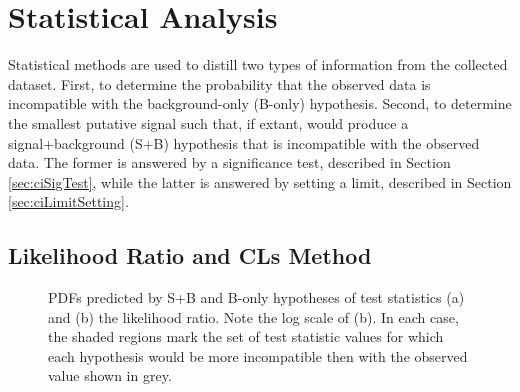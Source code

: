 \section{Statistical Analysis}\label{sec:ciStat}

Statistical methods are used to distill two types of information from the collected dataset.
First, to determine the probability that the observed data is incompatible with the background-only (B-only) hypothesis.
Second, to determine the smallest putative signal such that, if extant, would produce a signal+background (S+B) hypothesis that is incompatible with the observed data.
The former is answered by a significance test, described in Section \ref{sec:ciSigTest}, while the latter is answered by setting a limit, described in Section \ref{sec:ciLimitSetting}.

\subsection{Likelihood Ratio and CLs Method}

\begin{figure}[h!]
\captionsetup[subfigure]{position=b}
\centering
{}
\caption{PDFs predicted by S+B and B-only hypotheses of test statistics (a) \nobs and (b) the likelihood ratio. Note the log scale of (b). In each case, the shaded regions mark the set of test statistic values for which each hypothesis would be more incompatible then with the observed value shown in grey.}
\label{fig:ciCls}
\end{figure}

